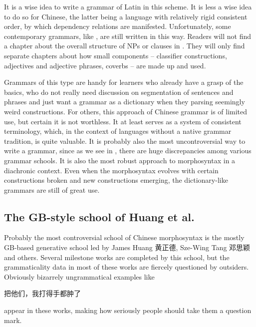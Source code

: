 It is a wise idea to write a grammar of Latin in this scheme. It is less a wise idea to do so for Chinese,
the latter being a language with relatively rigid consistent order, by which dependency relations 
are manifested. Unfortunately, some contemporary grammars, like \citet{po2015chinese}, are still 
written in this way. Readers will not find a chapter about the overall structure of NPs or clauses 
in \citet{po2015chinese}. They will only find separate chapters about how small components -- classifier
constructions, adjectives and adjective phrases, coverbs -- are made up and used.

Grammars of this type are handy for learners who already have a grasp of the basics, who do not really need 
discussion on segmentation of sentences and phrases and just want a grammar as a dictionary when they 
parsing seemingly weird constructions. For others, this approach of Chinese grammar is of limited use,
but certain it is not worthless. It at least serves as a system of consistent terminology, which, in 
the context of languages without a native grammar tradition, is quite valuable. It is probably also 
the most uncontroversial way to write a grammar, since as we see in ,
there are huge discrepancies among various grammar schools. It is also the most robust approach to 
morphosyntax in a diachronic context. Even when the morphosyntax evolves with certain constructions broken 
and new constructions emerging, the dictionary-like grammars are still of great use. 

\subsection{The GB-style school of Huang et al.}\label{sec:gb-grammar}

Probably the most controversial school of Chinese morphosyntax is the mostly GB-based generative school led by James Huang 黄正德, 
Sze-Wing Tang 邓思颖 and others. Several milestone works are completed by this school, but the grammaticality 
data in most of these works are fiercely questioned by outsiders. Obviously bizarrely ungrammatical examples 
like \citep[sec. 5.4.2, (65)]{huang2013} 
\begin{exe}
    \ex\label{ex:huang-weird-1} 把他们，我打得手都肿了
\end{exe}
appear in these works, making how seriously people should take them a question mark.

